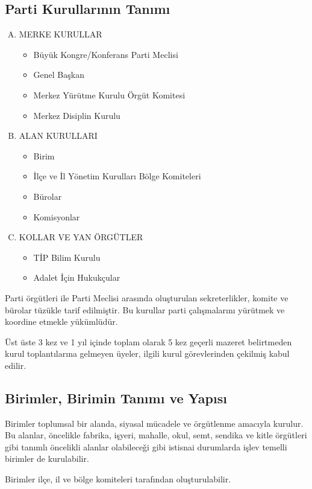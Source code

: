 \documentclass[11pt]{article} %
\begin{document}
\subsection{Parti Kurullarının Tanımı}
\begin{enumerate}[A)]
\item{MERKE KURULLAR}
	\begin{itemize}
		\item Büyük Kongre/Konferans Parti Meclisi
		\item Genel Başkan
		\item Merkez Yürütme Kurulu Örgüt Komitesi
		\item Merkez Disiplin Kurulu
	\end{itemize}
\item{ALAN KURULLARI}
	\begin{itemize}
		\item Birim
		\item İlçe ve İl Yönetim Kurulları Bölge Komiteleri
		\item Bürolar
		\item Komisyonlar
	\end{itemize}

\item{KOLLAR VE YAN ÖRGÜTLER}
	\begin{itemize}
		\item TİP Bilim Kurulu 
		\item Adalet İçin Hukukçular
	\end{itemize}
\end{enumerate}


Parti örgütleri ile Parti Meclisi arasında oluşturulan sekreterlikler, komite ve bürolar tüzükle tarif edilmiştir. Bu kurullar parti çalışmalarını yürütmek ve koordine etmekle yükümlüdür.

Üst üste 3 kez ve 1 yıl içinde toplam olarak 5 kez geçerli mazeret belirtmeden kurul toplantılarına gelmeyen üyeler, ilgili kurul görevlerinden çekilmiş kabul edilir.


\subsection{Birimler, Birimin Tanımı ve Yapısı}
Birimler toplumsal bir alanda, siyasal mücadele ve örgütlenme amacıyla kurulur. Bu alanlar, öncelikle fabrika, işyeri, mahalle, okul, semt, sendika ve kitle örgütleri gibi tanımlı öncelikli alanlar olabileceǧi gibi istisnai durumlarda işlev temelli birimler de kurulabilir.

Birimler ilçe, il ve bölge komiteleri tarafından oluşturulabilir.
\end{document}
